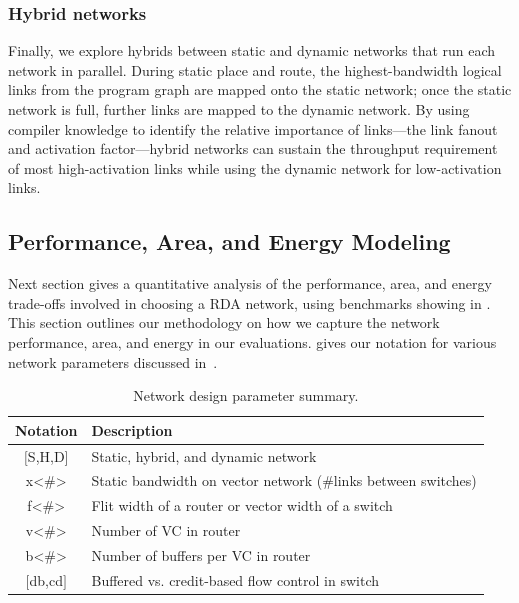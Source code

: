 \subsubsection{Hybrid networks}
Finally, we explore hybrids between static and dynamic networks that run each network in parallel. 
During static place and route, the highest-bandwidth logical links from the program graph are mapped onto the static network; once the static network is full, further links are mapped to the dynamic network.
By using compiler knowledge to identify the relative importance of links---the link fanout and activation factor---hybrid networks can sustain the throughput requirement of most high-activation links while using the dynamic network for low-activation links.

\subsection{Performance, Area, and Energy Modeling} \label{sec:net_char}

Next section gives a quantitative analysis of the performance, area, and energy trade-offs involved 
in choosing a RDA network, using benchmarks showing in .
This section outlines our methodology on how we capture the network performance, area, and energy in our evaluations.
 gives our notation for various network parameters discussed
in~.

\begin{table}
\footnotesize
  \centering
\begin{tabular*}{0.65\textwidth}{c l}
  \bottomrule
  \textbf{Notation} & \textbf{Description} \\\midrule
  $[$S,H,D$]$ & Static, hybrid, and dynamic network \\\midrule
  x<\#> & Static bandwidth on vector network (\#links between switches) \\\midrule
  f<\#> & Flit width of a router or vector width of a switch \\\midrule
  v<\#> & Number of VC in router \\\midrule
  b<\#> & Number of buffers per VC in router \\\midrule
  $[$db,cd$]$ & Buffered vs. credit-based flow control in switch \\\midrule
\end{tabular*}
\caption{Network design parameter summary.}
\label{tab:notation}
\end{table}

